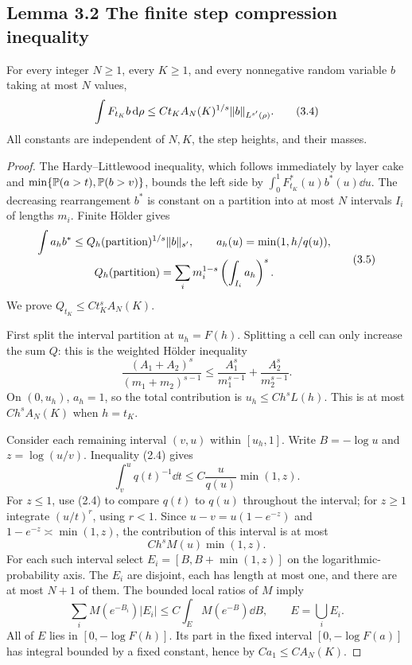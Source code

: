 \subsection*{Lemma 3.2 \quad The finite step compression inequality}
For every integer $N\ge1$, every $K\ge1$, and every nonnegative random variable $b$ taking at most $N$ values,
\begin{equation}
 \int F_{t_K}b\,\mathrm d\rho
 \le C t_K A_N(K)^{1/s}\lVert b\rVert_{L^{s'}(\rho)}.\tag{3.4}
\end{equation}
All constants are independent of $N,K$, the step heights, and their masses.
\begin{proof}
The Hardy--Littlewood inequality, which follows immediately by layer cake and $\min\{\mathbb P(a>t),\mathbb P(b>v)\}$, bounds the left side by $\int_0^1 F_{t_K}^*(u)b^*(u)\dd u$. The decreasing rearrangement $b^*$ is constant on a partition into at most $N$ intervals $I_i$ of lengths $m_i$. Finite H\"older gives
\begin{equation}
 \begin{gathered}
 \int a_hb^*\le Q_h(\text{partition})^{1/s}\lVert b\rVert_{s'},\qquad
 a_h(u)=\min(1,h/q(u)),\\
 Q_h(\text{partition})=\sum_i m_i^{1-s}
 \left(\int_{I_i}a_h\right)^s.
 \end{gathered}\tag{3.5}
\end{equation}
We prove $Q_{t_K}\le Ct_K^sA_N(K)$.

First split the interval partition at $u_h=F(h)$. Splitting a cell can only increase the sum $Q$: this is the weighted H\"older inequality
\[
 \frac{(A_1+A_2)^s}{(m_1+m_2)^{s-1}}
 \le\frac{A_1^s}{m_1^{s-1}}+\frac{A_2^s}{m_2^{s-1}}.
\]
On $(0,u_h)$, $a_h=1$, so the total contribution is $u_h\le Ch^sL(h)$. This is at most $Ch^sA_N(K)$ when $h=t_K$.

Consider each remaining interval $(v,u)$ within $[u_h,1]$. Write $B=-\log u$ and $z=\log(u/v)$. Inequality (2.4) gives
\[
 \int_v^u q(t)^{-1}\dd t\le C\frac u{q(u)}\min(1,z).
\]
For $z\le1$, use (2.4) to compare $q(t)$ to $q(u)$ throughout the interval; for $z\ge1$ integrate $(u/t)^r$, using $r<1$. Since $u-v=u(1-e^{-z})$ and $1-e^{-z}\asymp\min(1,z)$, the contribution of this interval is at most
\begin{equation}
 Ch^sM(u)\min(1,z).\tag{3.6}
\end{equation}
For each such interval select $E_i=[B,B+\min(1,z)]$ on the logarithmic-probability axis. The $E_i$ are disjoint, each has length at most one, and there are at most $N+1$ of them. The bounded local ratios of $M$ imply
\begin{equation}
 \sum_i M(e^{-B_i})|E_i|\le C\int_E M(e^{-B})\dd B,
 \qquad E=\bigcup_iE_i.\tag{3.7}
\end{equation}
All of $E$ lies in $[0,-\log F(h)]$. Its part in the fixed interval $[0,-\log F(a)]$ has integral bounded by a fixed constant, hence by $Ca_1\le CA_N(K)$.


\end{proof}
